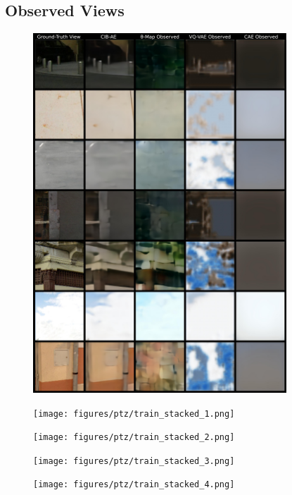 \begin{appendices}
\section{Observed Views}
\begin{figure}[H]
    \centering
    \includegraphics[width=0.85\textwidth]{figures/ptz/train_stacked_0.png}
\end{figure}
\begin{figure}[H]
    \centering
    \texttt{[image: figures/ptz/train\_stacked\_1.png]}
\end{figure}
\begin{figure}[H]
    \centering
    \texttt{[image: figures/ptz/train\_stacked\_2.png]}
\end{figure}
\begin{figure}[H]
    \centering
    \texttt{[image: figures/ptz/train\_stacked\_3.png]}
\end{figure}
\begin{figure}[H]
    \centering
    \texttt{[image: figures/ptz/train\_stacked\_4.png]}
\end{figure}


\end{appendices}
